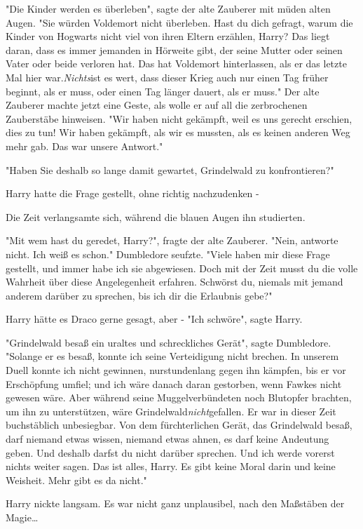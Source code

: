 {"Die Kinder werden es überleben", sagte der alte Zauberer mit müden alten Augen. "Sie würden Voldemort nicht überleben. Hast du dich gefragt, warum die Kinder von Hogwarts nicht viel von ihren Eltern erzählen, Harry? Das liegt daran, dass es immer jemanden in Hörweite gibt, der seine Mutter oder seinen Vater oder beide verloren hat. Das hat Voldemort hinterlassen, als er das letzte Mal hier war.\emph{Nichts}ist es wert, dass dieser Krieg auch nur einen Tag früher beginnt, als er muss, oder einen Tag länger dauert, als er muss." Der alte Zauberer machte jetzt eine Geste, als wolle er auf all die zerbrochenen Zauberstäbe hinweisen. "Wir haben nicht gekämpft, weil es uns gerecht erschien, dies zu tun! Wir haben gekämpft, als wir es mussten, als es keinen anderen Weg mehr gab. Das war unsere Antwort."

"Haben Sie deshalb so lange damit gewartet, Grindelwald zu konfrontieren?"

Harry hatte die Frage gestellt, ohne richtig nachzudenken -

Die Zeit verlangsamte sich, während die blauen Augen ihn studierten.

"Mit wem hast du geredet, Harry?", fragte der alte Zauberer. "Nein, antworte nicht. Ich weiß es schon." Dumbledore seufzte. "Viele haben mir diese Frage gestellt, und immer habe ich sie abgewiesen. Doch mit der Zeit musst du die volle Wahrheit über diese Angelegenheit erfahren. Schwörst du, niemals mit jemand anderem darüber zu sprechen, bis ich dir die Erlaubnis gebe?"

Harry hätte es Draco gerne gesagt, aber - "Ich schwöre", sagte Harry.

"Grindelwald besaß ein uraltes und schreckliches Gerät", sagte Dumbledore. "Solange er es besaß, konnte ich seine Verteidigung nicht brechen. In unserem Duell konnte ich nicht gewinnen, nurstundenlang gegen ihn kämpfen, bis er vor Erschöpfung umfiel; und ich wäre danach daran gestorben, wenn Fawkes nicht gewesen wäre. Aber während seine Muggelverbündeten noch Blutopfer brachten, um ihn zu unterstützen, wäre Grindelwald\emph{nicht}gefallen. Er war in dieser Zeit buchstäblich unbesiegbar. Von dem fürchterlichen Gerät, das Grindelwald besaß, darf niemand etwas wissen, niemand etwas ahnen, es darf keine Andeutung geben. Und deshalb darfst du nicht darüber sprechen. Und ich werde vorerst nichts weiter sagen. Das ist alles, Harry. Es gibt keine Moral darin und keine Weisheit. Mehr gibt es da nicht."

Harry nickte langsam. Es war nicht ganz unplausibel, nach den Maßstäben der Magie…

}
